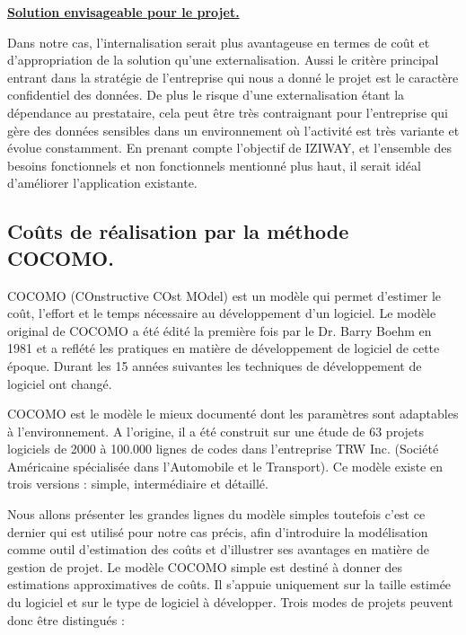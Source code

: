 {{\textbf{\underline{Solution envisageable pour le projet.}}

Dans notre cas, l’internalisation serait plus avantageuse en termes de coût et d’appropriation de la solution qu’une externalisation. Aussi le critère principal entrant dans la stratégie de l’entreprise qui nous a donné le projet est le caractère confidentiel des données. De plus le risque d’une externalisation étant la dépendance au prestataire, cela peut être très contraignant pour l’entreprise qui gère des données sensibles dans un environnement où l’activité est très variante et évolue constamment. En prenant compte l’objectif de IZIWAY, et l’ensemble des besoins fonctionnels et non fonctionnels mentionné plus haut, il serait idéal d’améliorer l’application existante.



\subsection{Coûts de réalisation par la méthode COCOMO.}

COCOMO (COnstructive COst MOdel) est un modèle qui permet d’estimer le coût, l’effort et le temps nécessaire au développement d’un logiciel. Le modèle original de COCOMO a été édité la première fois par le Dr. Barry Boehm en 1981 et a reflété les pratiques en matière de développement de logiciel de cette époque. Durant les 15 années suivantes les techniques de développement de logiciel ont changé.

COCOMO est le modèle le mieux documenté dont les paramètres sont adaptables à l’environnement. A l’origine, il a été construit sur une étude de 63 projets logiciels de 2000 à 100.000 lignes de codes dans l’entreprise TRW Inc. (Société Américaine spécialisée dans l’Automobile et le Transport). Ce modèle existe en trois versions : simple, intermédiaire et détaillé.

Nous allons présenter les grandes lignes du modèle simples toutefois c’est ce dernier qui est utilisé pour notre cas précis, afin d’introduire la modélisation comme outil d’estimation des coûts et d’illustrer ses avantages en matière de gestion de projet. Le modèle COCOMO simple est destiné à donner des estimations approximatives de coûts. Il s’appuie uniquement sur la taille estimée du logiciel et sur le type de logiciel à développer. Trois modes de projets peuvent donc être distingués : 

}}
